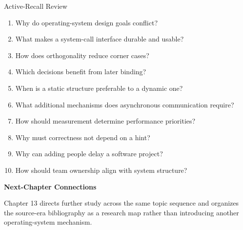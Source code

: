 \documentclass[10pt,letterpaper]{article}
\begin{document}
\enlargethispage{2\baselineskip}
\begin{studybox}{Active-Recall Review}
\small
\begin{enumerate}
  \item Why do operating-system design goals conflict?
  \item What makes a system-call interface durable and usable?
  \item How does orthogonality reduce corner cases?
  \item Which decisions benefit from later binding?
  \item When is a static structure preferable to a dynamic one?
  \item What additional mechanisms does asynchronous communication require?
  \item How should measurement determine performance priorities?
  \item Why must correctness not depend on a hint?
  \item Why can adding people delay a software project?
  \item How should team ownership align with system structure?
\end{enumerate}
\end{studybox}

\par\medskip
{\color{navy}\bfseries Next-Chapter Connections}\par\smallskip
Chapter 13 directs further study across the same topic sequence and organizes the source-era bibliography as a research map rather than introducing another operating-system mechanism.
\normalsize
\end{document}
